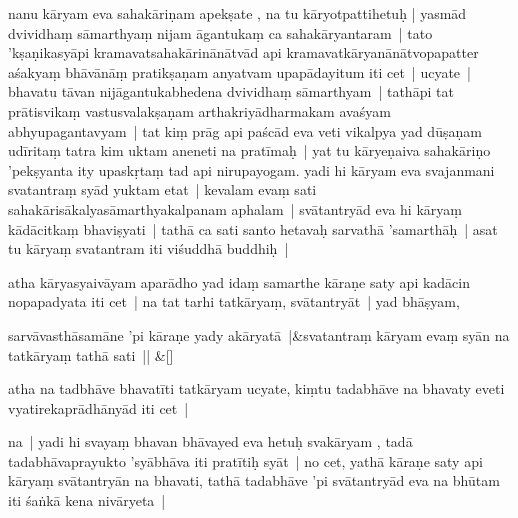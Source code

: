 \documentclass[article,12pt,a4paper]{memoir}%
\newcounter{parCount}
\begin{document}
	  
	  \pstart \leavevmode%
	\label{thakur75-76.6}nanu kāryam eva sahakāriṇam apekṣate , na tu kāryotpattihetuḥ | yasmād dvividhaṃ sāmarthyaṃ nijam āgantukaṃ ca sahakāryantaram | tato 'kṣaṇikasyāpi kramavatsahakārinānātvād api kramavatkāryanānātvopapatter aśakyaṃ bhāvānāṃ pratikṣaṇam anyatvam upapādayitum iti cet |\label{thakur75-76.9} ucyate | bhavatu tāvan nijāgantukabhedena dvividhaṃ sāmarthyam | tathāpi tat prātisvikaṃ vastusvalakṣaṇam arthakriyādharmakam avaśyam abhyupagantavyam | tat kiṃ prāg api paścād eva veti vikalpya yad dūṣaṇam udīritaṃ tatra kim uktam aneneti na pratīmaḥ | \label{thakur75-76.12} yat tu kāryeṇaiva sahakāriṇo 'pekṣyanta ity upaskṛtaṃ tad api nirupayogam. yadi hi kāryam eva svajanmani svatantraṃ syād yuktam etat | kevalam evaṃ sati sahakārisākalyasāmarthyakalpanam aphalam | svātantryād eva hi kāryaṃ kādācitkaṃ bhaviṣyati | tathā ca sati santo hetavaḥ sarvathā 'samarthāḥ | asat tu kāryaṃ svatantram iti viśuddhā buddhiḥ |
	{}
	\pend%
      

	  
	  \pstart \leavevmode%
	\label{thakur75-76.17}atha kāryasyaivāyam aparādho yad idaṃ samarthe kāraṇe saty api kadācin nopapadyata iti cet | na tat tarhi tatkāryaṃ, svātantryāt |\label{thakur75-76.18} yad bhāṣyam,
	{}
	\pend%
      
	    
	    \stanza[\smallbreak]
	  sarvāvasthāsamāne 'pi kāraṇe yady akāryatā |&svatantraṃ kāryam evaṃ syān na tatkāryaṃ tathā sati || \&[\smallbreak]
	  
	  
	  

	  
	  \pstart \leavevmode%
	\label{thakur75-76.21}atha na tadbhāve bhavatīti tatkāryam ucyate, kiṃtu tadabhāve na bhavaty eveti vyatirekaprādhānyād iti cet |
	{}
	\pend%
      

	  
	  \pstart \leavevmode%
	\label{thakur75-76.22}na | yadi hi svayaṃ bhavan bhāvayed eva hetuḥ svakāryam , tadā tadabhāvaprayukto 'syābhāva iti pratītiḥ syāt | no cet, yathā kāraṇe saty api kāryaṃ svātantryān na bhavati, tathā tadabhāve 'pi svātantryād eva na bhūtam iti śaṅkā kena nivāryeta |
	{}
	\pend%
      
\end{document}

